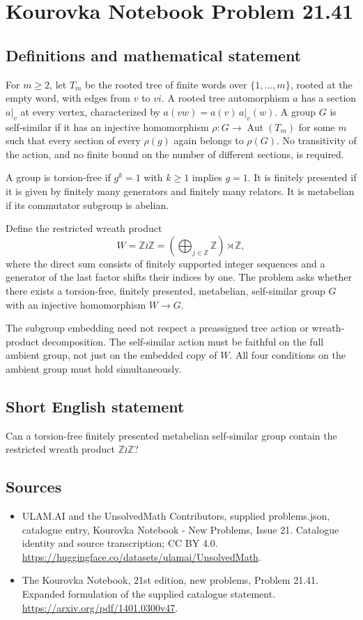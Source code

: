 \documentclass[11pt,a4paper]{article}
\begin{document}
\section*{Kourovka Notebook Problem 21.41}\label{statement}

\subsection{Definitions and mathematical statement}
For $m\ge2$, let $T_m$ be the rooted tree of finite words over
$\{1,\ldots,m\}$, rooted at the empty word, with edges from $v$ to
$vi$. A rooted tree automorphism $a$ has a section $a|_v$ at every
vertex, characterized by $a(vw)=a(v)\,a|_v(w)$.
A group $G$ is self-similar if it has an injective homomorphism
$\rho:G\to\operatorname{Aut}(T_m)$ for some $m$ such that every section
of every $\rho(g)$ again belongs to $\rho(G)$. No transitivity of the
action, and no finite bound on the number of different sections, is
required.

A group is torsion-free if $g^k=1$ with $k\ge1$ implies $g=1$.
It is finitely presented if it is given by finitely many generators
and finitely many relators. It is metabelian if its commutator subgroup
is abelian.

Define the restricted wreath product
\[
 W=\mathbb Z\wr\mathbb Z
     =\left(\bigoplus_{j\in\mathbb Z}\mathbb Z\right)\rtimes\mathbb Z,
\]
where the direct sum consists of finitely supported integer sequences
and a generator of the last factor shifts their indices by one.
The problem asks whether there exists a torsion-free, finitely presented,
metabelian, self-similar group $G$ with an injective homomorphism $W\to G$.

The subgroup embedding need not respect a preassigned tree action or
wreath-product decomposition. The self-similar action must be faithful
on the full ambient group, not just on the embedded copy of $W$.
All four conditions on the ambient group must hold simultaneously.
\subsection{Short English statement}
Can a torsion-free finitely presented metabelian self-similar group contain the restricted wreath product $\mathbb Z\wr\mathbb Z$?
\subsection{Sources}
\begin{itemize}
\item[S1] ULAM.AI and the UnsolvedMath Contributors, supplied problems.json, catalogue entry, Kourovka Notebook - New Problems, Issue 21. Catalogue identity and source transcription; CC BY 4.0.
\url{https://huggingface.co/datasets/ulamai/UnsolvedMath}.
\item[S2] The Kourovka Notebook, 21st edition, new problems, Problem 21.41. Expanded formulation of the supplied catalogue statement.
\url{https://arxiv.org/pdf/1401.0300v47}.
\end{itemize}
\end{document}
